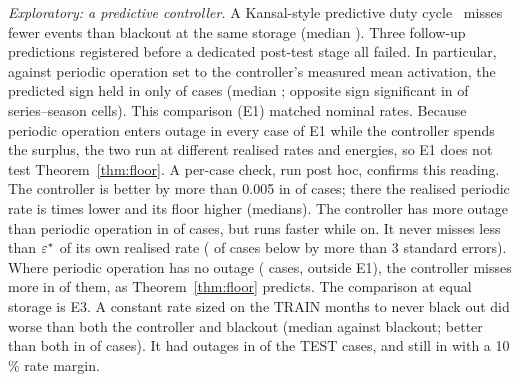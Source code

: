 \emph{Exploratory: a predictive controller.} A Kansal-style predictive duty cycle~\cite{kansal2007} misses fewer events than blackout at the same storage (median \ExKblk). Three follow-up predictions registered before a dedicated post-test stage all failed. In particular, against periodic operation set to the controller's measured mean activation, the predicted sign held in only \ExOneShare{} of cases (median \ExOneMed; opposite sign significant in \ExOneWrong{} of \ExOneN{} series--season cells). This comparison (E1) matched nominal rates. Because periodic operation enters outage in every case of E1 while the controller spends the surplus, the two run at different realised rates and energies, so E1 does not test Theorem~\ref{thm:floor}. A per-case check, run post hoc, confirms this reading. The controller is better by more than 0.005 in \KcNwin{} of \KcNcases{} cases; there the realised periodic rate is \KcRateRatio{} times lower and its floor \KcGapMed{} higher (medians). The controller has more outage than periodic operation in \KcKmoreOutPct{} of cases, but runs faster while on. It never misses less than $\varepsilon^*$ of its own realised rate (\KcKoneFail{} of \KcNall{} cases below by more than 3 standard errors). Where periodic operation has no outage (\KcNnoOut{} cases, outside E1), the controller misses more in \KcNoOutLosePct{} of them, as Theorem~\ref{thm:floor} predicts. The comparison at equal storage is E3. A constant rate sized on the TRAIN months to never black out did worse than both the controller and blackout (median \ExThreeBlk{} against blackout; better than both in \ExThreeBoth{} of cases). It had outages in \ExThreeOutZero{} of the TEST cases, and still in \ExThreeOutTen{} with a 10\,\% rate margin.

